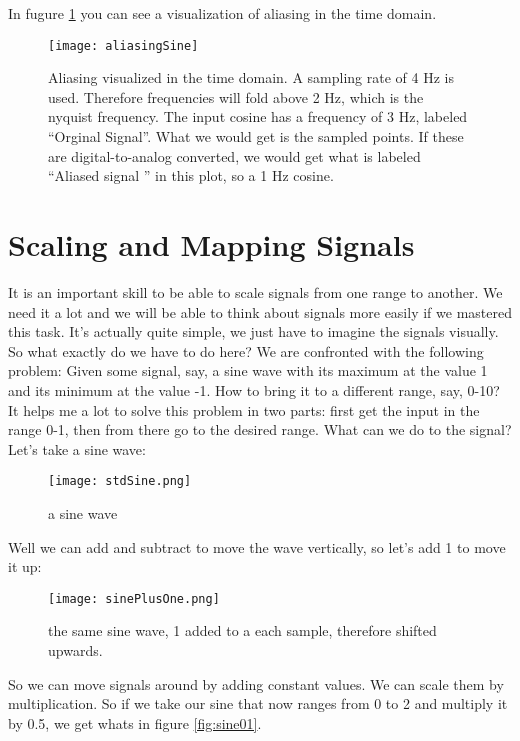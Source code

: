 In fugure \ref{fig:cosAlias} you can see a visualization of aliasing in the time domain.  

\begin{figure}[H]
	\centering
	\texttt{[image: aliasingSine]}
	\caption[shortCaption]
	{Aliasing visualized in the time domain. A sampling rate of 4 Hz is used. Therefore frequencies will fold above 2 Hz, which is the nyquist frequency. The input cosine has a frequency of 3 Hz, labeled ``Orginal Signal''. What we would get is the sampled points. If these are digital-to-analog converted, we would get what is labeled ``Aliased signal '' in this plot, so a 1 Hz cosine.}
	\label{fig:cosAlias}
\end{figure}



\section{Scaling and Mapping Signals}
It is an important skill to be able to scale signals from one range to another. We need it a lot and we will be able to think about signals more easily if we mastered this task. It's actually quite simple, we just have to imagine the signals visually.\\
So what exactly do we have to do here? We are confronted with the following problem: Given some signal, say, a sine wave with its maximum at the value 1 and its minimum at the value -1. How to bring it to a different range, say, 0-10?\\
It helps me a lot to solve this problem in two parts: first get the input in the range 0-1, then from there go to the desired range. What can we do to the signal? Let's take a sine wave:

\begin{figure}[h!]
	\centering
	\texttt{[image: stdSine.png]}
	\caption[a sine wave]
	{a sine wave}
	\label{fig:aSine}
\end{figure}
Well we can add and subtract to move the wave vertically, so let's add 1 to move it up:

\begin{figure}[h!]
	\centering
	\texttt{[image: sinePlusOne.png]}
	\caption[a sine wave]
	{the same sine wave, 1 added to a each sample, therefore shifted upwards.}
	\label{fig:aShiftedSine}
\end{figure}

So we can move signals around by adding constant values. We can scale them by multiplication. So if we take our sine that now ranges from 0 to 2 and multiply it by 0.5, we get whats in figure \ref{fig:sine01}.

